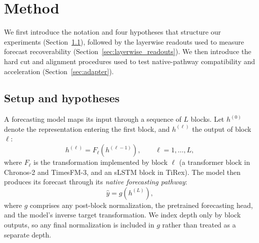 \documentclass{article} %
\begin{document}
\section{Method}
\label{sec:method}

We first introduce the notation and four hypotheses that structure our experiments (Section~\ref{sec:intuition}), followed by the layerwise readouts used to measure forecast recoverability (Section~\ref{sec:layerwise_readouts}). We then introduce the hard cut and alignment procedures used to test native-pathway compatibility and acceleration (Section~\ref{sec:adapter}).

\subsection{Setup and hypotheses}
\label{sec:intuition}

A forecasting model maps its input through a sequence of \(L\) blocks. Let \(h^{(0)}\) denote the representation entering the first block, and \(h^{(\ell)}\) the output of block \(\ell\):
\begin{equation}
h^{(\ell)} = F_{\ell}\!\left(h^{(\ell-1)}\right), \qquad \ell = 1,\dots,L,
\label{eq:stage_transform}
\end{equation}
where $F_{\ell}$ is the transformation implemented by block $\ell$ (a transformer block in Chronos-2 and TimesFM-3, and an sLSTM block in TiRex). The model then produces its forecast through its \emph{native forecasting pathway}:
\begin{equation}
\hat{y} = g\!\left(h^{(L)}\right),
\label{eq:native_forecast}
\end{equation}
where $g$ comprises any post-block normalization, the pretrained forecasting head, and the model's inverse target transformation. We index depth only by block outputs, so any final normalization is included in $g$ rather than treated as a separate depth.
\end{document}
